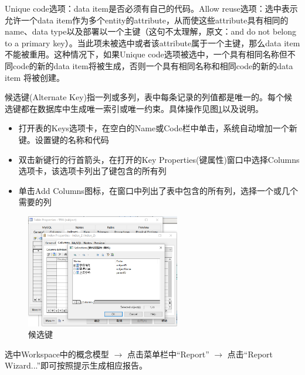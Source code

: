 \documentclass[11pt]{article}
\begin{document}
  Unique code选项：data item是否必须有自己的代码。Allow reuse选项：选中表示允许一个data item作为多个entity的attribute，从而使这些attribute具有相同的name、data type以及部署以一个主键（这句不太理解，原文：and do not belong to a primary key）。当此项未被选中或者该attribute属于一个主键，那么data item不能被重用。这种情况下，如果Unique code选项被选中，一个具有相同名称但不同code的新的data item将被生成，否则一个具有相同名称和相同code的新的data item 将被创建。


  候选键(Alternate Key)指一列或多列，表中每条记录的列值都是唯一的。每个候选键都在数据库中生成唯一索引或唯一约束。具体操作见图\ref{tab:AlternateKey}以及说明。
  \begin{itemize}
    \item[1.] 打开表的Keys选项卡，在空白的Name或Code栏中单击，系统自动增加一个新键。设置键的名称和代码
    \item[2.] 双击新键行的行首箭头，在打开的Key Properties(键属性)窗口中选择Columns选项卡，该选项卡列出了键包含的所有列
    \item[3.] 单击Add Columns图标，在窗口中列出了表中包含的所有列，选择一个或几个需要的列 
  \end{itemize}

  \begin{figure}[h]
    \centering
    \includegraphics[width=0.6\textwidth]{候选键.png}
    \caption{候选键}
    \label{tab:AlternateKey}
  \end{figure}


  选中Workspace中的概念模型 $\rightarrow$ 点击菜单栏中“Report” $\rightarrow$ 点击“Report Wizard...”即可按照提示生成相应报告。




% 
\end{document}
